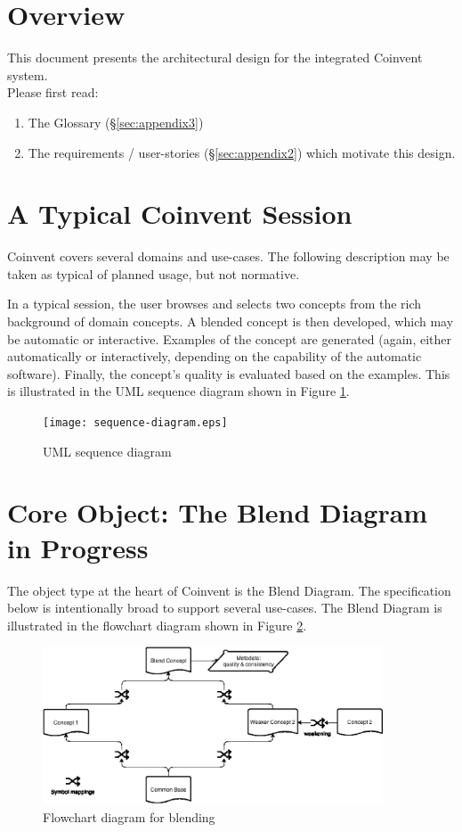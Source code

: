 \section{Overview}\label{sec:overview}

This document presents the architectural design for the integrated Coinvent system. \mbox{}\\
Please first read:
\begin{enumerate}
\item{The Glossary (\S\ref{sec:appendix3})}
\item{The requirements / user-stories (\S\ref{sec:appendix2}) which motivate this design.}
\end{enumerate}

\section{A Typical Coinvent Session}\label{sec:typical}

Coinvent covers several domains and use-cases. The following description may be taken
as typical of planned usage, but not normative.

In a typical session, the user browses and selects two concepts from the 
rich background of domain concepts. A blended concept is then developed, which
may be automatic or interactive. Examples of the concept are generated (again, either
automatically or interactively, depending on the capability of the automatic software). Finally, the concept's quality is evaluated based on the examples.
This is illustrated in the UML sequence diagram shown in Figure \ref{fig:sequence-diagram}.
\begin{figure}[!ht]
\texttt{[image: sequence-diagram.eps]}
\label{fig:sequence-diagram}
\caption{UML sequence diagram}
\end{figure}

\section{Core Object: The Blend Diagram in Progress}\label{sec:bdip}

The object type at the heart of Coinvent is the Blend Diagram. The specification below is intentionally broad to support several use-cases. The Blend Diagram is illustrated in the flowchart diagram shown in Figure \ref{fig:flowchart}.

\begin{figure}[!ht]
\includegraphics[width=0.9\textwidth]{BlendDiagram.eps}
\caption{Flowchart diagram for blending}
\label{fig:flowchart}
\end{figure}


